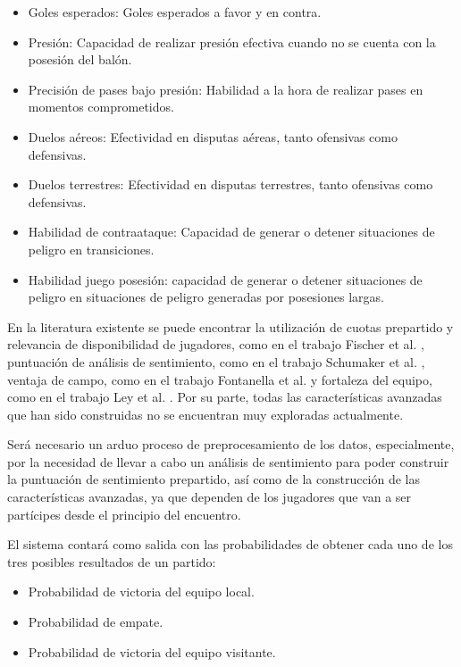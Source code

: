 \begin{enumerate}
    \begin{itemize}
        \item Goles esperados: Goles esperados a favor y en contra.
        \item Presión: Capacidad de realizar presión efectiva cuando no se cuenta con la posesión del balón.
        \item Precisión de pases bajo presión: Habilidad a la hora de realizar pases en momentos comprometidos.
        \item Duelos aéreos: Efectividad en disputas aéreas, tanto ofensivas como defensivas.
        \item Duelos terrestres: Efectividad en disputas terrestres, tanto ofensivas como defensivas.
        \item Habilidad de contraataque: Capacidad de generar o detener situaciones de peligro en transiciones.
         \item Habilidad juego posesión: capacidad de generar o detener situaciones de peligro en situaciones de peligro generadas por posesiones largas.
    \end{itemize}
\end{enumerate}

En la literatura existente se puede encontrar la utilización de cuotas prepartido y relevancia de disponibilidad de jugadores, como en el trabajo Fischer et al. \cite{Fisher2024PricingResponse}, puntuación de análisis de sentimiento, como en el trabajo Schumaker et al. \cite{Schumaker2016}, ventaja de campo, como en el trabajo Fontanella et al. \cite{Fontanella2020Visual} y fortaleza del equipo, como en el trabajo Ley et al. \cite{leyRankingSoccerTeams2019}. Por su parte, todas las características avanzadas que han sido construidas no se encuentran muy exploradas actualmente.

Será necesario un arduo proceso de preprocesamiento de los datos, especialmente, por la necesidad de llevar a cabo un análisis de sentimiento para poder construir la puntuación de sentimiento prepartido, así como de la construcción de las características avanzadas, ya que dependen de los jugadores que van a ser partícipes desde el principio del encuentro.

El sistema contará como salida con las probabilidades de obtener cada uno de los tres posibles resultados de un partido:
\begin{itemize}
    \item Probabilidad de victoria del equipo local.
    \item Probabilidad de empate.
    \item Probabilidad de victoria del equipo visitante.
\end{itemize}

